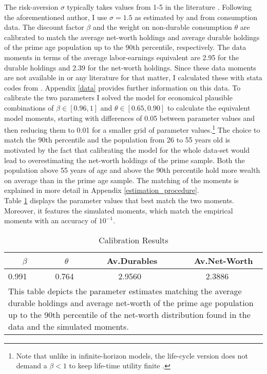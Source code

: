 \documentclass[a4paper,12pt,legno]{article}
\begin{document}
The risk-aversion $\sigma$ typically takes values from 1-5 in the literature \citep{yang2009}. Following the aforementioned author, I use $\sigma = 1.5$ as estimated by \cite{attanasio1999} and \cite{Gourinchas&Parker2002} from consumption data. The discount factor $\beta$ and the weight on non-durable consumption $\theta$ are calibrated to match the average net-worth holdings and average durable holdings of the prime age population up to the 90th percentile, respectively. The data moments in terms of the average labor-earnings equivalent are 2.95 for the durable holdings and 2.39 for the net-worth  holdings. Since these data moments are not available in \cite{hintermaier2011} or any literature for that matter, I calculated these with stata codes from \cite{hintermaier2016}. Appendix \ref{data} provides further information on this data. To calibrate the two parameters I solved the model for economical plausible combinations of $\beta \in [0.96,1]$ and $\theta \in [0.65,0.90]$ to calculate the equivalent model moments, starting with differences of 0.05 between parameter values and then reducing them to 0.01 for a smaller grid of parameter values.\footnote{Note that unlike in infinite-horizon models, the life-cycle version does not demand a $\beta < 1$ to keep life-time utility finite \cite[p. 360]{heer2004dge}.} The choice to match the 90th percentile and the population from 26 to 55 years old is motivated by the fact that calibrating the model for the whole data-set would lead to overestimating the net-worth holdings of the prime sample. Both the population
above 55 years of age and above the 90th percentile hold more wealth on average than
in the prime age sample. The matching of the moments is explained in more detail in Appendix \ref{estimation_procedure}. \\
Table \ref{estimates} displays the parameter values that best match the two moments. Moreover, it features the simulated moments, which match the empirical moments with an accuracy of $10^{-1}$.

\begin{table}[!htbp]
\centering
\caption{Calibration Results}
\label{estimates}
\begin{tabular}{@{}llll@{}}
\toprule
\ \ \ $\beta$ & \ \ $\theta$ & \ Av.Durables & \ Av.Net-Worth \\ \midrule
0.991 \ \ \ \   & 0.764 \ \ \ \ & \ \ \ \ 2.9560 & \ \ \ \ 2.3886  \\ \bottomrule
\multicolumn{4}{l}{%
  \begin{minipage}{9.5cm}%
    \small This table depicts the parameter estimates matching the average durable holdings and average net-worth of the prime age population up to the 90th percentile of the net-worth distribution found in the data and the simulated moments.  
  \end{minipage}%
}\\
\end{tabular}
\end{table}
\end{document}
